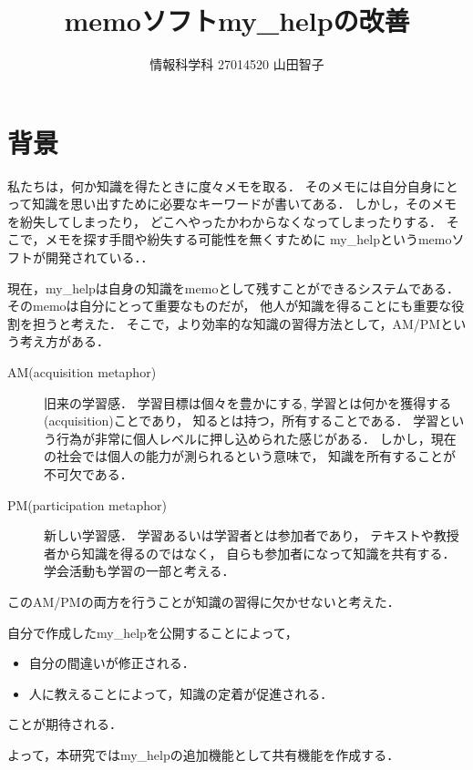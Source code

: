 \documentclass[a4j,twocolumn,uplatex]{jsarticle}
\begin{document}
\title{memoソフトmy\_helpの改善}
\author{情報科学科 \hspace{5mm} 27014520 \hspace{5mm}山田智子}
\date{}
\maketitle

\section{背景}
私たちは，何か知識を得たときに度々メモを取る．
そのメモには自分自身にとって知識を思い出すために必要なキーワードが書いてある． 
しかし，そのメモを紛失してしまったり，
どこへやったかわからなくなってしまったりする．
そこで，メモを探す手間や紛失する可能性を無くすために
my\_helpというmemoソフトが開発されている．\cite{my_help}．

現在，my\_helpは自身の知識をmemoとして残すことができるシステムである．
そのmemoは自分にとって重要なものだが，
他人が知識を得ることにも重要な役割を担うと考えた．
そこで，より効率的な知識の習得方法として，AM/PMという考え方がある．\cite{sfard}

\begin{description}
\item[AM(acquisition metaphor)] 旧来の学習感．                                       
学習目標は個々を豊かにする, 学習とは何かを獲得する(acquisition)ことであり，
知るとは持つ，所有することである．
学習という行為が非常に個人レベルに押し込められた感じがある．
しかし，現在の社会では個人の能力が測られるという意味で， 
知識を所有することが不可欠である．

\item[PM(participation metaphor)] 新しい学習感．
学習あるいは学習者とは参加者であり，
テキストや教授者から知識を得るのではなく，
自らも参加者になって知識を共有する．
学会活動も学習の一部と考える．
 \end{description}

 
 このAM/PMの両方を行うことが知識の習得に欠かせないと考えた．

自分で作成したmy\_helpを公開することによって，
\begin{itemize}
\item 自分の間違いが修正される．
\item 人に教えることによって，知識の定着が促進される．
\end{itemize}
ことが期待される．

よって，本研究ではmy\_helpの追加機能として共有機能を作成する．
\end{document}
